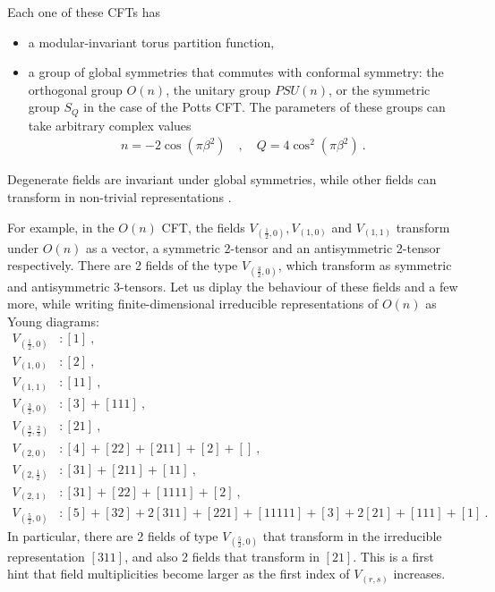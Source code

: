 \documentclass[12pt, a4paper]{article}
\begin{document}
Each one of these CFTs has
\begin{itemize}
 \item a modular-invariant torus partition function,
 \item a group of global symmetries that commutes with conformal symmetry: the orthogonal group $O(n)$, the unitary group $PSU(n)$, or the symmetric group $S_Q$ in the case of the Potts CFT. The parameters of these groups can take arbitrary complex values \cite{gnjrs21, br19}
 \begin{align}
  \boxed{n = -2\cos\left(\pi \beta^2\right)} \quad , \quad \boxed{Q = 4\cos^2\left(\pi \beta^2\right)}\ .
  \label{nQ}
 \end{align}
\end{itemize}
Degenerate fields are invariant under global symmetries, while other fields can transform in non-trivial representations \cite{jrs22, rjrs24}. 

For example, in the $O(n)$ CFT, the fields $V_{(\frac12,0)},V_{(1,0)}$ and $V_{(1,1)}$ transform under $O(n)$ as a vector, a symmetric 2-tensor and an antisymmetric 2-tensor respectively. There are 2 fields of the type $V_{(\frac32,0)}$, which transform as symmetric and antisymmetric 3-tensors. Let us diplay the behaviour of these fields and a few more, while writing finite-dimensional irreducible representations of $O(n)$ as Young diagrams:
\begin{subequations}
\label{von}
\begin{align}
 V_{(\frac12,0)} &: [1]\ , \label{lhz}
 \\
 V_{(1,0)} &: [2]\ ,
 \\
 V_{(1,1)} &: [11]\ , \label{loo}
 \\
 V_{(\frac32,0)}&: [3]+[111]\ ,
\label{l320}
\\
V_{(\frac32,\frac23)} &: [21]\ ,
\label{l3223}
\\
V_{(2,0)}&: [4]+[22]+[211]+[2]+[]\ ,
\label{l20}
\\
V_{(2,\frac12)}& : [31]+[211]+[11]\ ,
\\
V_{(2,1)} &: [31]+[22]+[1111]+[2]\ ,
\label{l21}
\\
V_{(\frac52,0)} &: [5]+[32]+2[311]+[221]+[11111]+[3]+2[21]+[111]+[1]\ .
\label{l52}
\end{align}
\end{subequations}
In particular, there are 2 fields of type $V_{(\frac52,0)}$ that transform in the irreducible representation $[311]$, and also 2 fields that transform in $[21]$. This is a first hint that field multiplicities become larger as the first index of $V_{(r,s)}$ increases. 
\end{document}
